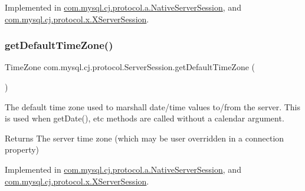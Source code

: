 Implemented in \mbox{\hyperlink{classcom_1_1mysql_1_1cj_1_1protocol_1_1a_1_1_native_server_session_a027379497479b7a43755ff49ad37e96f}{com.\+mysql.\+cj.\+protocol.\+a.\+Native\+Server\+Session}}, and \mbox{\hyperlink{classcom_1_1mysql_1_1cj_1_1protocol_1_1x_1_1_x_server_session_a59472f33d971d60e15b396ded510eb3a}{com.\+mysql.\+cj.\+protocol.\+x.\+X\+Server\+Session}}.

\mbox{\label{interfacecom_1_1mysql_1_1cj_1_1protocol_1_1_server_session_a080efb1043278f9c6d13f7dc24d18476}} 
\subsubsection{\texorpdfstring{get\+Default\+Time\+Zone()}{getDefaultTimeZone()}}
{\footnotesize\ttfamily Time\+Zone com.\+mysql.\+cj.\+protocol.\+Server\+Session.\+get\+Default\+Time\+Zone (\begin{DoxyParamCaption}{ }\end{DoxyParamCaption})}

The default time zone used to marshall date/time values to/from the server. This is used when get\+Date(), etc methods are called without a calendar argument.

\begin{DoxyReturn}{Returns}
The server time zone (which may be user overridden in a connection property) 
\end{DoxyReturn}


Implemented in \mbox{\hyperlink{classcom_1_1mysql_1_1cj_1_1protocol_1_1a_1_1_native_server_session_abba6aad0abd51609f134af9fa2cd345f}{com.\+mysql.\+cj.\+protocol.\+a.\+Native\+Server\+Session}}, and \mbox{\hyperlink{classcom_1_1mysql_1_1cj_1_1protocol_1_1x_1_1_x_server_session_aacde6eddcc1fd40cc726095f2f2d6b44}{com.\+mysql.\+cj.\+protocol.\+x.\+X\+Server\+Session}}.

\mbox{\label{interfacecom_1_1mysql_1_1cj_1_1protocol_1_1_server_session_a437ab4e5fb2cdd6cc66f206bce8688cd}} 
